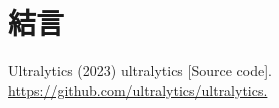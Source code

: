 \documentclass[10pt]{jarticle}
\begin{document}
      
    \section{結\hspace{2zw}言}%

    \vspace{1truemm}
    {\footnotesize
        \begin{thebibliography}{99}

            Ultralytics (2023) ultralytics [Source code]. \url{https://github.com/ultralytics/ultralytics.}
        
        \end{thebibliography}
    }
    \normalsize
    
\end{document}
